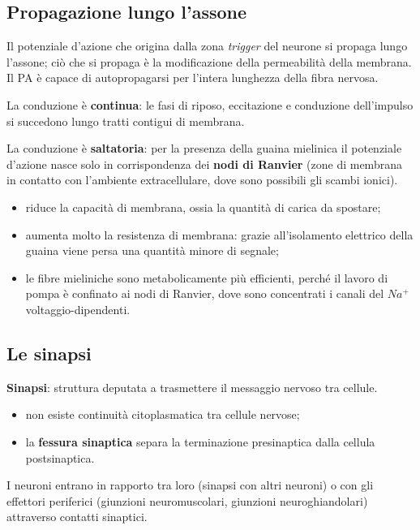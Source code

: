 \subsection{Propagazione lungo l'assone}

Il potenziale d'azione che origina dalla zona \textit{trigger} del neurone si propaga lungo l'assone; ciò che si propaga è la modificazione della permeabilità della membrana. Il PA è capace di autopropagarsi per l'intera lunghezza della fibra nervosa.

La conduzione è \textbf{continua}: le fasi di riposo, eccitazione e conduzione dell'impulso si succedono lungo tratti contigui di membrana.

La conduzione è \textbf{saltatoria}: per la presenza della guaina mielinica il potenziale d'azione nasce solo in corrispondenza dei \textbf{nodi di Ranvier} (zone di membrana in contatto con l'ambiente extracellulare, dove sono possibili gli scambi ionici).

\begin{itemize}
  \item riduce la capacità di membrana, ossia la quantità di carica da spostare;
  \item aumenta molto la resistenza di membrana: grazie all'isolamento elettrico della guaina viene persa una quantità minore di segnale;
  \item le fibre mieliniche sono metabolicamente più efficienti, perché il lavoro di pompa è confinato ai nodi di Ranvier, dove sono concentrati i canali del $Na^+$ voltaggio-dipendenti.
\end{itemize}

\subsection{Le sinapsi}

\textbf{Sinapsi}: struttura deputata a trasmettere il messaggio nervoso tra cellule.
\begin{itemize}
  \item non esiste continuità citoplasmatica tra cellule nervose;
  \item la \textbf{fessura sinaptica} separa la terminazione presinaptica dalla cellula postsinaptica.
\end{itemize}
I neuroni entrano in rapporto tra loro (sinapsi con altri neuroni) o con gli effettori periferici (giunzioni neuromuscolari, giunzioni neuroghiandolari) attraverso contatti sinaptici.

